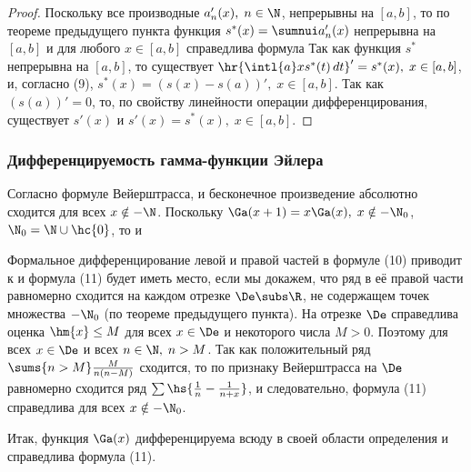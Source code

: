 \documentclass[a4paper]{article}
\begin{document}
\begin{proof}
Поскольку все производные $a_n'(x), \; n\in\N$, непрерывны на
$[a,b]$, то по теореме предыдущего пункта функция $s^*(x) = \sumnui
a_n'(x)$ непрерывна на $[a,b]$ и для любого $x\in[a,b]$ справедлива
формула  Так как
функция $s^*$ непрерывна на $[a,b]$, то существует
$\hr{\intl{a}xs^*(t)\,dt}'=s^*(x), \; x\in[a,b]$, и, согласно (9),
$s^*(x) = (s(x)-s(a))', \; x\in[a,b]$. Так как $(s(a))'=0$, то, по
свойству линейности операции дифференцирования, существует $s'(x)$ и
$s'(x)=s^*(x), \; x\in[a,b]$.
\end{proof}

\subsubsection{Дифференцируемость гамма-функции Эйлера}

Согласно формуле Вейерштрасса, 
и бесконечное произведение абсолютно сходится для всех $x\notin
-\N$. Поскольку $\Ga(x+1)=x\Ga(x), \; x\notin -\N_0$,
$\N_0=\N\cup\hc{0}$, то  и 

Формальное дифференцирование левой и правой частей в формуле (10)
приводит к  и формула (11) будет
иметь место, если мы докажем, что ряд в её правой части равномерно
сходится на каждом отрезке $\De\subs\R$, не содержащем точек
множества $-\N_0$ (по теореме предыдущего пункта). На отрезке $\De$
справедлива оценка $\hm{x}\le M$ для всех $x\in\De$ и некоторого
числа $M>0$. Поэтому  для всех $x\in\De$ и
всех $n\in\N, \; n>M$. Так как положительный ряд $\sums{n>M}
\frac{M}{n(n-M)}$ сходится, то по признаку Вейерштрасса на $\De$
равномерно сходится ряд $\sum \hs{\frac1n - \frac1{n+x}}$, и
следовательно, формула (11) справедлива для всех $x\notin -\N_0$.

Итак, функция $\Ga(x)$ дифференцируема всюду в своей области
определения и справедлива формула (11).
\end{document}
